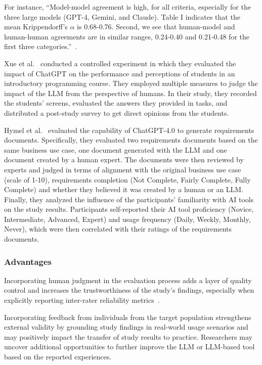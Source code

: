For instance, ``Model-model agreement is high, for all criteria, especially for the three large models (GPT-4, Gemini, and Claude). Table I indicates that the mean Krippendorff’s $\alpha$ is 0.68-0.76. 
Second, we see that human-model and human-human agreements are in similar ranges, 0.24-0.40 and 0.21-0.48
for the first three categories.''~\cite{DBLP:journals/corr/abs-2408-05534}.

Xue et al.~\cite{DBLP:conf/icse/XueCBTH24} conducted a controlled experiment in which they evaluated the impact of ChatGPT on the performance and perceptions of students in an introductory programming course.
They employed multiple measures to judge the impact of the LLM from the perspective of humans.
In their study, they recorded the students' screens, evaluated the answers they provided in tasks, and distributed a post-study survey to get direct opinions from the students.

Hymel et al.~\cite{hymel2025analysisllmsvshuman} evaluated the capability of ChatGPT-4.0 to generate requirements documents. 
Specifically, they evaluated two requirements documents based on the same business use case, one document generated with the LLM and one document created by a human expert.
The documents were then reviewed by experts and judged in terms of alignment with the original business use case (scale of 1-10), requirements completion (Not Complete, Fairly Complete, Fully Complete) and whether they believed it was created by a human or an LLM.
Finally, they analyzed the influence of the participants' familiarity with AI tools on the study results.
Participants self-reported their AI tool proficiency (Novice, Intermediate, Advanced, Expert) and usage frequency (Daily, Weekly, Monthly, Never), which were then correlated with their ratings of the requirements documents.


\subsubsection{Advantages}

Incorporating human judgment in the evaluation process adds a layer of quality control and increases the trustworthiness of the study's findings, especially when explicitly reporting inter-rater reliability metrics~\cite{khraisha2024canlargelanguagemodelshumans}.

Incorporating feedback from individuals from the target population strengthens external validity by grounding study findings in real-world usage scenarios and may positively impact the transfer of study results to practice.
Researchers may uncover additional opportunities to further improve the LLM or LLM-based tool based on the reported experiences.

